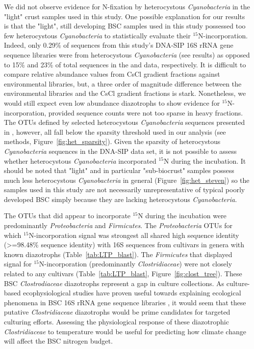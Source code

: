 We did not observe evidence for N-fixation by heterocystous
\textit{Cyanobacteria} in the "light" crust samples used in this study. One
possible explanation for our results is that the "light", still developing
BSC samples used in this study possessed too few heterocystous
\textit{Cyanobacteria} to statistically evaluate their $^{15}$N-incorporation.
Indeed, only 0.29\% of sequences from this study's DNA-SIP 16S rRNA gene
sequence libraries were from heterocystous \textit{Cyanobacteria} (see results)
as opposed to 15\% and 23\% of total sequences in the \citet{Steven_2013} and
\citet{Garcia_Pichel_2013} data, respectively. It is difficult to compare
relative abundance values from CsCl gradient fractions against environmental
libraries, but, a three order of magnitude difference between the
environmental libraries and the CsCl gradient fractions is stark.
Nonetheless, we would still expect even low abundance diazotrophs to show
evidence for $^{15}$N-incorporation, provided sequence counts were not too
sparse in heavy fractions. The OTUs defined by selected heterocystous
\textit{Cyanobacteria} sequences presented in \citet{Yeager}, however, all
fall below the sparsity threshold used in our analysis (see methods,
Figure~\ref{fig:het_sparsity}). Given the sparsity of heterocystous
\textit{Cyanobacteria} sequences in the DNA-SIP data set, it is not possible
to assess whether heterocystous \textit{Cyanobacteria} incorporated $^{15}$N
during the incubation. It should be noted that "light" and in particular
"sub-biocrust" samples possess much less heterocystous \textit{Cyanobacteria}
in general (Figure~\ref{fig:het_steven}) so the samples used in this study are
not necessarily unrepresentative of typical poorly developed BSC simply because
they are lacking heterocystous \textit{Cyanobacteria}. 

The OTUs that did appear to incorporate $^{15}$N during the incubation were
predominantly \textit{Proteobacteria} and \textit{Firmicutes}. The
\textit{Proteobacteria} OTUs for which $^{15}$N-incorporation signal was
strongest all shared high sequence identity (\textgreater=98.48\% sequence
identity) with 16S sequences from cultivars in genera with known diazotrophs
(Table~\ref{tab:LTP_blast}). The \textit{Firmicutes} that displayed signal
for $^{15}$N-incorporation (predominantly \textit{Clostridiaceae}) were not
closely related to any cultivars (Table~\ref{tab:LTP_blast},
Figure~\ref{fig:clost_tree}). These BSC \textit{Clostrodiaceae} diazotrophs
represent a gap in culture collections. As culture-based ecophysiological
studies have proven useful towards explaining ecological phenomena in BSC 16S
rRNA gene sequence libraries \citep{Garcia_Pichel_2013}, it would seem that
these putative \textit{Clostridiaceae} diazotrophs would be prime candidates
for targeted culturing efforts. Assessing the physiological response of these
diazotrophic \textit{Clostridiaceae} to temperature would be useful for
predicting how climate change will affect the BSC nitrogen budget. 

